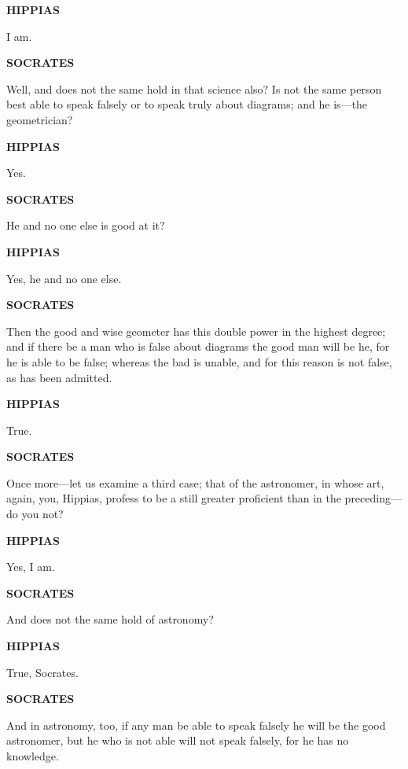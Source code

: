 \documentclass[11pt,letter]{article}
\begin{document}
\par \textbf{HIPPIAS}
\par   I am.

\par \textbf{SOCRATES}
\par   Well, and does not the same hold in that science also? Is not the same person best able to speak falsely or to speak truly about diagrams; and he is—the geometrician?

\par \textbf{HIPPIAS}
\par   Yes.

\par \textbf{SOCRATES}
\par   He and no one else is good at it?

\par \textbf{HIPPIAS}
\par   Yes, he and no one else.

\par \textbf{SOCRATES}
\par   Then the good and wise geometer has this double power in the highest degree; and if there be a man who is false about diagrams the good man will be he, for he is able to be false; whereas the bad is unable, and for this reason is not false, as has been admitted.

\par \textbf{HIPPIAS}
\par   True.

\par \textbf{SOCRATES}
\par   Once more—let us examine a third case; that of the astronomer, in whose art, again, you, Hippias, profess to be a still greater proficient than in the preceding—do you not?

\par \textbf{HIPPIAS}
\par   Yes, I am.

\par \textbf{SOCRATES}
\par   And does not the same hold of astronomy?

\par \textbf{HIPPIAS}
\par   True, Socrates.

\par \textbf{SOCRATES}
\par   And in astronomy, too, if any man be able to speak falsely he will be the good astronomer, but he who is not able will not speak falsely, for he has no knowledge.
\end{document}
